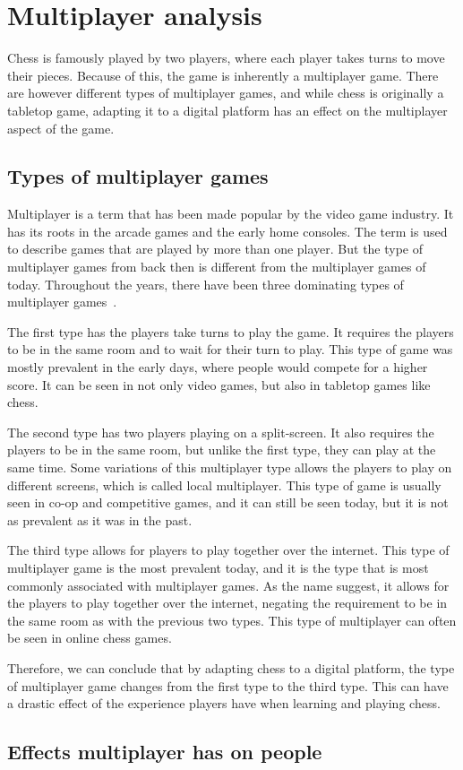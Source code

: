 \section{Multiplayer analysis}\label{sec:multiplayer-analysis}

Chess is famously played by two players, where each player takes turns to move their pieces.
Because of this, the game is inherently a multiplayer game.
There are however different types of multiplayer games, and while chess is originally a tabletop game, adapting it to a 
digital platform has an effect on the multiplayer aspect of the game.

\subsection{Types of multiplayer games}\label{subsec:types-of-multiplayer-games}

Multiplayer is a term that has been made popular by the video game industry.
It has its roots in the arcade games and the early home consoles.
The term is used to describe games that are played by more than one player.
But the type of multiplayer games from back then is different from the multiplayer games of today.
Throughout the years, there have been three dominating types of multiplayer games~\cite{multiplayer-types}.

The first type has the players take turns to play the game.
It requires the players to be in the same room and to wait for their turn to play.
This type of game was mostly prevalent in the early days, where people would compete for a higher score.
It can be seen in not only video games, but also in tabletop games like chess.

The second type has two players playing on a split-screen.
It also requires the players to be in the same room, but unlike the first type, they can play at the same time.
Some variations of this multiplayer type allows the players to play on different screens, which is called local 
multiplayer.
This type of game is usually seen in co-op and competitive games, and it can still be seen today, but it is not as 
prevalent as it was in the past.

The third type allows for players to play together over the internet.
This type of multiplayer game is the most prevalent today, and it is the type that is most commonly associated with
multiplayer games.
As the name suggest, it allows for the players to play together over the internet, negating the requirement to be in the
same room as with the previous two types.
This type of multiplayer can often be seen in online chess games.

Therefore, we can conclude that by adapting chess to a digital platform, the type of multiplayer game changes from the
first type to the third type.
This can have a drastic effect of the experience players have when learning and playing chess.

\subsection{Effects multiplayer has on people}\label{subsec:effects-multiplayer-has-on-people}

